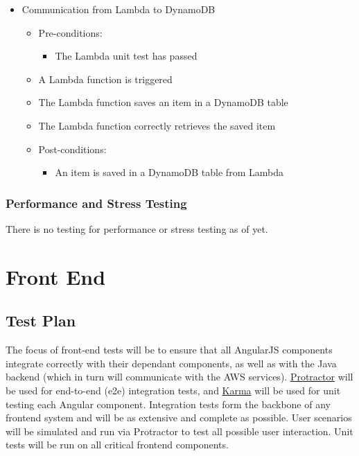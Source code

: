 \documentclass{article}
\begin{document}
\begin{itemize}
				\item{Communication from Lambda to DynamoDB}
				\begin{itemize}
					\item Pre-conditions: 
					\begin{itemize}
						\item The Lambda unit test has passed
					\end{itemize}
					\item A Lambda function is triggered
					\item The Lambda function saves an item in a DynamoDB table
					\item The Lambda function correctly retrieves the saved item
					\item Post-conditions:
					\begin{itemize}
						\item An item is saved in a DynamoDB table from Lambda
					\end{itemize}
				\end{itemize}
			\end{itemize}
			
			\subsubsection{Performance and Stress Testing}
			There is no testing for performance or stress testing as of yet.
\newpage

\section{Front End}
	\subsection{Test Plan}
	The focus of front-end tests will be to ensure that all AngularJS components integrate correctly with their dependant components, as well as with the Java backend (which in turn will communicate with the AWS services). \href{http://www.protractortest.org/#/}{Protractor} will be used for end-to-end (e2e) integration tests, and \href{https://karma-runner.github.io/1.0/index.html}{Karma} will be used for unit testing each Angular component. Integration tests form the backbone of any frontend system and will be as extensive and complete as possible. User scenarios will be simulated and run via Protractor to test all possible user interaction. Unit tests will be run on all critical frontend components.
	
\end{document}
